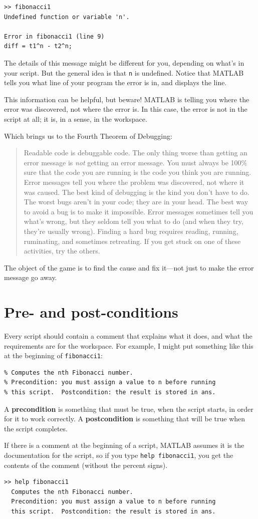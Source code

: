\documentclass{book}
\newcommand{\displaythrm}[1]{%
    \ifthenelse{\equal{#1}{1}}%
        {Readable code is debuggable code.}{%
    \ifthenelse{\equal{#1}{2}}%
        {The only thing worse than getting an error message is {\em
         not} getting an error message.}{%
    \ifthenelse{\equal{#1}{3}}%
        {You must always be 100\% sure that the code you are running
         is the code you think you are running.}{%
    \ifthenelse{\equal{#1}{4}}%
        {Error messages tell you where the problem was discovered,
         not where it was caused.}{%
    \ifthenelse{\equal{#1}{5}}%
        {The best kind of debugging is the kind you don't have to do.}{%
    \ifthenelse{\equal{#1}{6}}%
        {The worst bugs aren't in your code; they are in your head.}{%
    \ifthenelse{\equal{#1}{7}}%
        {The best way to avoid a bug is to make it impossible.}{%
    \ifthenelse{\equal{#1}{8}}%
        {Error messages sometimes tell you what's wrong, but they
         seldom tell you what to do (and when they try, they're usually
         wrong).}{%
    \ifthenelse{\equal{#1}{9}}%
        {Finding a hard bug requires reading, running, ruminating,
         and sometimes retreating.  If you get stuck on one of these
         activities, try the others.}{%
    {}%
}}}}}}}}}}%
\begin{document}
\begin{verbatim}
>> fibonacci1
Undefined function or variable 'n'.

Error in fibonacci1 (line 9)
diff = t1^n - t2^n;
\end{verbatim}

The details of this message might be different for you, depending
on what's in your script.  But the general idea is that {\tt n}
is undefined.  Notice that MATLAB tells you what line of your
program the error is in, and displays the line.

This information can be helpful, but beware!  MATLAB is telling you
where the error was discovered, not where the error is.  In this
case, the error is not in the script at all; it is, in a sense, in
the workspace.

Which brings us to the Fourth Theorem of Debugging:

\begin{quote}
\displaythrm{4}
\end{quote}

The object of the game is to find the cause and
fix it---not just to make the error message go away.


\section{Pre- and post-conditions}

Every script should contain a comment that explains
what it does, and what the requirements are for the workspace.  For
example, I might put something like this at the beginning of
{\tt fibonacci1}:

\begin{verbatim}
% Computes the nth Fibonacci number.
% Precondition: you must assign a value to n before running
% this script.  Postcondition: the result is stored in ans.
\end{verbatim}

A {\bf precondition} is something that must be true, when the script
starts, in order for it to work correctly.  A {\bf postcondition}
is something that will be true when the script completes.

If there is a comment at the beginning of a script, MATLAB assumes
it is the documentation for the script, so if you type {\tt help
fibonacci1}, you get the contents of the comment (without the percent
signs).

\begin{verbatim}
>> help fibonacci1
  Computes the nth Fibonacci number.
  Precondition: you must assign a value to n before running
  this script.  Postcondition: the result is stored in ans.
\end{verbatim}
\end{document}
